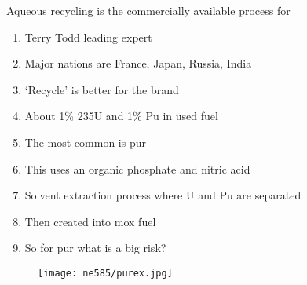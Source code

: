 \documentclass[aspectratio=1610,pdftex,dvipsnames,compress,xcolor={dvipsnames}]{beamer}
\newcommand{\acs}{\acrshort} %
\newcommand{\acsp}{\acrshortpl} %
\begin{document}
\addtocounter{framenumber}{-1} 
\begin{frame}{Aqueous recycling is the \href{https://uidaho.pressbooks.pub/nuclearengineering/chapter/countercurrent-solvent-extraction/}{commercially available} process for \acsp{lwr}}
    \begin{enumerate}[series=outerlist,topsep=0pt,itemsep=18pt,leftmargin=*,label=(\arabic*)]
        \item[]Terry Todd leading expert
        \item[]Major nations are France, Japan, Russia, India
        \item[]`Recycle' is better for the brand
        \item[]About 1\% 235U and 1\% Pu in used fuel
        \item[]The most common is \acs{pur}
        \item[]This uses an organic phosphate and nitric acid
        \item[]Solvent extraction process where U and Pu are separated
        \item[]Then created into \acs{mox} fuel
        \item[]So for \acs{pur} what is a big risk?
    \end{enumerate}
\end{frame}


\begin{frame}{}
    \begin{figure}
        \centering
        \texttt{[image: ne585/purex.jpg]}
    \end{figure}
\end{frame}
\end{document}
